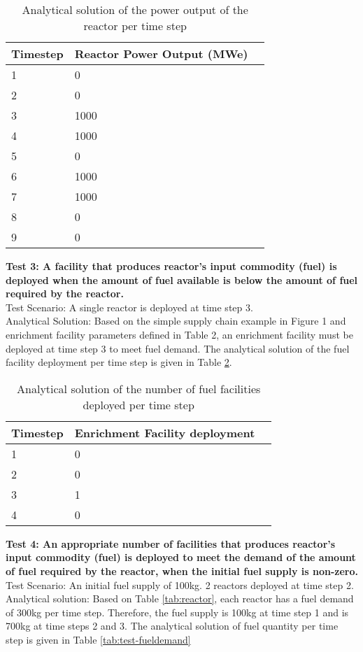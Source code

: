 \documentclass[12pt,letterpaper]{article}
\begin{document}
\begin{table}[H]
     \centering
    \begin{tabularx}{\textwidth}{bbb}
       \hline
       Timestep & Reactor Power Output (MWe) \\
       \hline
       1 & 0 \\
       2 & 0 \\
       3 & 1000 \\
       4 & 1000 \\
       5 & 0 \\
       6 & 1000 \\
       7 & 1000 \\
       8 & 0 \\
       9 & 0 \\
       \hline
    \end{tabularx}
    \caption {Analytical solution of the power output of the reactor per time step}
    \label{tab:test-cycles}
\end{table}

\noindent
\textbf{Test 3: A facility that produces reactor’s input commodity (fuel) is deployed when the amount of fuel available is below the amount of fuel required by the reactor.} \\
Test Scenario: A single reactor is deployed at time step 3.\\
Analytical Solution: Based on the simple supply chain example in Figure 1 and enrichment facility parameters defined in Table 2, an enrichment facility must be deployed at time step 3 to meet fuel demand. The analytical solution of the fuel facility deployment per time step is given in Table \ref{tab:test-fuel}.

\begin{table}[H]
     \centering
    \begin{tabularx}{\textwidth}{bbb}
       \hline
       Timestep & Enrichment Facility deployment  \\
       \hline
       1 & 0 \\
       2 & 0 \\
       3 & 1\\
       4 & 0 \\
       \hline
    \end{tabularx}
    \caption {Analytical solution of the number of fuel facilities deployed per time step}
    \label{tab:test-fuel}
\end{table}

\noindent
\textbf{Test 4: An appropriate number of facilities that produces reactor's input commodity (fuel) is deployed to meet the demand of the amount of fuel required by the reactor, when the initial fuel supply is non-zero.} \\
Test Scenario: An initial fuel supply of 100kg. 2 reactors deployed at time step 2. \\
Analytical solution: Based on Table \ref{tab:reactor}, each reactor has a fuel demand of 300kg per time step. Therefore, the fuel supply is 100kg at time step 1 and is 700kg at time steps 2 and 3. The analytical solution of fuel quantity per time step is given in Table \ref{tab:test-fueldemand}  
\end{document}
